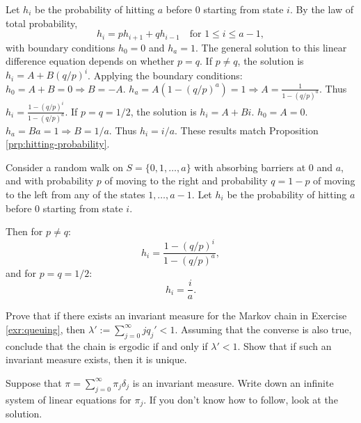 \begin{Solution}
Let $h_i$ be the probability of hitting $a$ before 0 starting from state $i$. By the law of total probability,
\[
h_i = p h_{i+1} + q h_{i-1} \quad \text{for } 1 \leq i \leq a-1,
\]
with boundary conditions $h_0 = 0$ and $h_a = 1$.
The general solution to this linear difference equation depends on whether $p=q$.
If $p \neq q$, the solution is $h_i = A + B(q/p)^i$. Applying the boundary conditions:
$h_0 = A + B = 0 \Rightarrow B = -A$.
$h_a = A(1 - (q/p)^a) = 1 \Rightarrow A = \frac{1}{1 - (q/p)^a}$.
Thus $h_i = \frac{1 - (q/p)^i}{1 - (q/p)^a}$.
If $p = q = 1/2$, the solution is $h_i = A + Bi$.
$h_0 = A = 0$.
$h_a = Ba = 1 \Rightarrow B = 1/a$.
Thus $h_i = i/a$.
These results match Proposition \ref{prp:hitting-probability}.
\end{Solution}

\begin{Proposition}
\label{prp:hitting-probability}
Consider a random walk on $S = \{0,1,\ldots,a\}$ with absorbing barriers at 0 and $a$, and with probability $p$ of moving to the right and probability $q = 1-p$ of moving to the left from any of the states $1,\ldots,a-1$. Let $h_i$ be the probability of hitting $a$ before 0 starting from state $i$.

Then for $p \neq q$:
\[
h_i = \frac{1 - (q/p)^i}{1 - (q/p)^a},
\]
and for $p = q = 1/2$:
\[
h_i = \frac{i}{a}.
\]
\end{Proposition}

\begin{Exercise}
\label{exr:ergodicity-queuing}
Prove that if there exists an invariant measure for the Markov chain in Exercise \ref{exr:queuing}, then $\lambda' := \sum_{j=0}^\infty j q_j' < 1$. Assuming that the converse is also true, conclude that the chain is ergodic if and only if $\lambda' < 1$. Show that if such an invariant measure exists, then it is unique.

\begin{hint}
Suppose that $\pi = \sum_{j=0}^\infty \pi_j \delta_j$ is an invariant measure. Write down an infinite system of linear equations for $\pi_j$. If you don't know how to follow, look at the solution.
\end{hint}
\end{Exercise}

